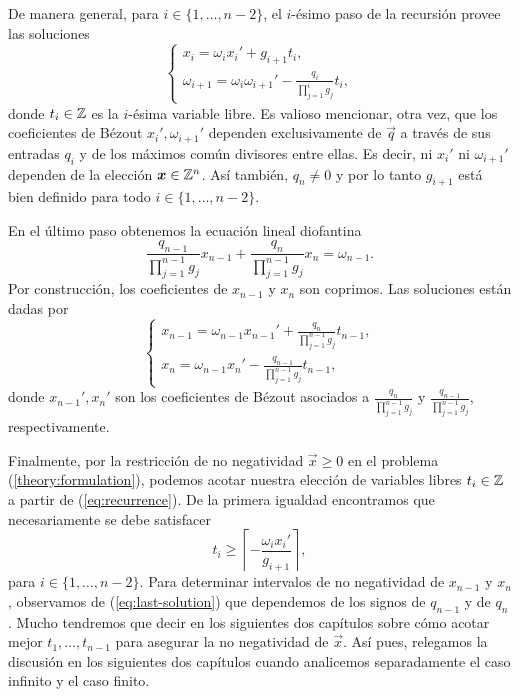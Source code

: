 De manera general, para $i \in \lbrace 1, \ldots, n - 2 \rbrace$, el $i$-ésimo paso de la recursión
provee las soluciones
\begin{equation}
	\label{eq:recurrence}
	\begin{cases}
		x_i = \omega_ix_i' + g_{i + 1}t_i, \\
		\omega_{i + 1} = \omega_i\omega_{i + 1}' - \frac{q_i}{\prod_{j=1}^{i}g_j}t_i,
	\end{cases}
\end{equation}
donde $t_i \in \mathbb{Z}$ es la $i$-ésima variable libre. Es valioso mencionar, otra vez, que los
coeficientes de Bézout $x_i', \omega_{i+1}'$ dependen exclusivamente de $\vec{q}$ a través de sus
entradas $q_i$ y de los máximos común divisores entre ellas. Es decir, ni $x_i'$ ni $\omega_{i
+ 1}'$ dependen de la elección $\boldsymbol{x} \in \mathbb{Z}^n$. Así también, $q_n \neq 0$ y por lo tanto
$g_{i + 1}$ está bien definido para todo $i \in \lbrace 1, \ldots, n - 2 \rbrace$.

En el último paso obtenemos la ecuación lineal diofantina
\begin{equation}
	\label{eq:last-equation}
	\frac{q_{n-1}}{\prod_{j=1}^{n-1}g_j}x_{n-1} +
	\frac{q_{n}}{\prod_{j=1}^{n-1}g_j}x_n
	= \omega_{n-1}.
\end{equation}
Por construcción, los coeficientes de $x_{n - 1}$ y $x_n$ son coprimos. Las soluciones
están dadas por
\begin{equation}
	\label{eq:last-solution}
	\begin{cases}
		x_{n-1} = \omega_{n-1}x_{n-1}' + \frac{q_n}{\prod_{j=1}^{n-1}g_j}t_{n-1}, \\
		x_n = \omega_{n-1}x_n' - \frac{q_{n-1}}{\prod_{j=1}^{n-1}g_j}t_{n-1},
	\end{cases}
\end{equation}
donde $x_{n-1}', x_n'$ son los coeficientes de Bézout asociados a
$\frac{q_n}{\prod_{j=1}^{n-1}g_j}$ y $\frac{q_{n-1}}{\prod_{j=1}^{n-1}g_j}$,
respectivamente.

Finalmente, por la restricción de no negatividad $\vec{x} \geq 0$ en el problema
(\ref{theory:formulation}), podemos acotar nuestra elección de variables libres $t_i \in \mathbb{Z}$ a
partir de (\ref{eq:recurrence}). De la primera igualdad encontramos que necesariamente se debe
satisfacer
\begin{equation}
	\label{eq:param-lb}
	t_i \geq \left\lceil -\frac{\omega_ix_i'}{g_{i + 1}} \right\rceil,
\end{equation}
para $i \in \lbrace 1, \ldots, n - 2\rbrace$. Para determinar intervalos de no negatividad de
$x_{n-1}$ y $x_n$, observamos de (\ref{eq:last-solution}) que dependemos de los signos
de $q_{n-1}$ y de $q_n$. Mucho tendremos que decir en los siguientes dos capítulos sobre
cómo acotar mejor $t_1, \ldots, t_{n-1}$ para asegurar la no negatividad de $\vec{x}$. Así pues,
relegamos la discusión en los siguientes dos capítulos cuando analicemos separadamente el caso
infinito y el caso finito.

